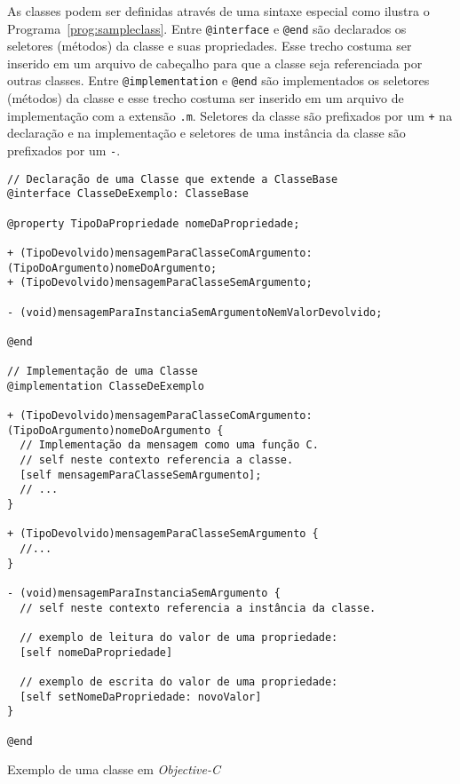 As classes podem ser definidas através de uma sintaxe especial como ilustra o Programa~\ref{prog:sampleclass}.
Entre \texttt{@interface} e \texttt{@end} são declarados os seletores (métodos) da classe e suas propriedades. Esse
trecho costuma ser inserido em um arquivo de cabeçalho para que a classe seja referenciada por outras classes.
Entre \texttt{@implementation} e \texttt{@end} são implementados os seletores (métodos) da classe e esse trecho costuma
ser inserido em um arquivo de implementação com a extensão \texttt{.m}.
Seletores da classe são prefixados por um \texttt{+} na declaração e na implementação
e seletores de uma instância da classe são prefixados por um \texttt{-}.

\begin{program}
  \centering

\lstset{language=[Objective]C}
\begin{lstlisting}[style=wider]
// Declaração de uma Classe que extende a ClasseBase
@interface ClasseDeExemplo: ClasseBase

@property TipoDaPropriedade nomeDaPropriedade;

+ (TipoDevolvido)mensagemParaClasseComArgumento:(TipoDoArgumento)nomeDoArgumento;
+ (TipoDevolvido)mensagemParaClasseSemArgumento;

- (void)mensagemParaInstanciaSemArgumentoNemValorDevolvido;

@end

// Implementação de uma Classe
@implementation ClasseDeExemplo

+ (TipoDevolvido)mensagemParaClasseComArgumento:(TipoDoArgumento)nomeDoArgumento {
  // Implementação da mensagem como uma função C.
  // self neste contexto referencia a classe.
  [self mensagemParaClasseSemArgumento];
  // ...
}

+ (TipoDevolvido)mensagemParaClasseSemArgumento {
  //...
}

- (void)mensagemParaInstanciaSemArgumento {
  // self neste contexto referencia a instância da classe.

  // exemplo de leitura do valor de uma propriedade:
  [self nomeDaPropriedade]

  // exemplo de escrita do valor de uma propriedade:
  [self setNomeDaPropriedade: novoValor]
}

@end
\end{lstlisting}

  \caption{Exemplo de uma classe em \emph{Objective-C}\label{prog:sampleclass}}
\end{program}

